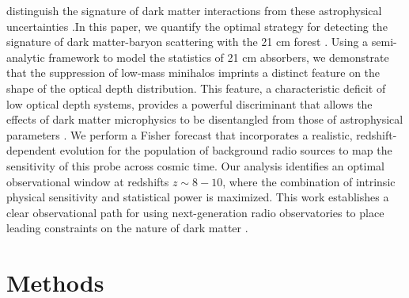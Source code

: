 \documentclass[]{article}
\begin{document}
distinguish the signature of dark matter interactions from these astrophysical uncertainties \citep{sun2025deeplearningdrivenlikelihoodfreeparameter,šoltinský2025prospectsstatisticaldetection21cm,zhao202621cmforestonedimensional}.In this paper, we quantify the optimal strategy for detecting the signature of dark matter-baryon scattering with the 21 cm forest \citep{hou2025effectsdarkmatterannihilation}. Using a semi-analytic framework to model the statistics of 21 cm absorbers, we demonstrate that the suppression of low-mass minihalos imprints a distinct feature on the shape of the optical depth distribution. This feature, a characteristic deficit of low optical depth systems, provides a powerful discriminant that allows the effects of dark matter microphysics to be disentangled from those of astrophysical parameters \citep{hou2025effectsdarkmatterannihilation}. We perform a Fisher forecast that incorporates a realistic, redshift-dependent evolution for the population of background radio sources to map the sensitivity of this probe across cosmic time. Our analysis identifies an optimal observational window at redshifts $z \sim 8-10$, where the combination of intrinsic physical sensitivity and statistical power is maximized. This work establishes a clear observational path for using next-generation radio observatories to place leading constraints on the nature of dark matter \citep{gluscevic2018constraintsscatteringkevtevdark,straight2026cmbconstraintsdarkmatterproton}.

\section{Methods}
\label{sec:methods}
\end{document}
